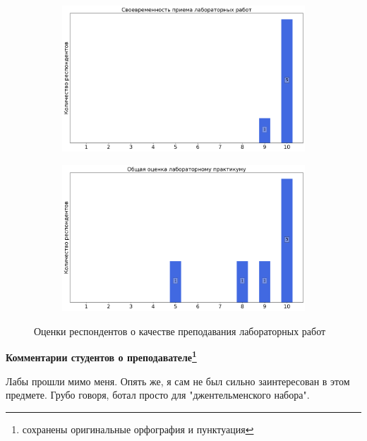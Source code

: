 \begin{figure}[H]
\begin{subfigure}[b]{0.45\textwidth}
                    \centering
                    \includegraphics[width=\textwidth]{images/3 course/Общая физика - квантовая физика/labniks-marks-Почернин И.Г.-2.png}
                \end{subfigure}
                \begin{subfigure}[b]{0.45\textwidth}
                    \centering
                    \includegraphics[width=\textwidth]{images/3 course/Общая физика - квантовая физика/labniks-marks-Почернин И.Г.-3.png}
                \end{subfigure}	
                \caption{Оценки респондентов о качестве преподавания лабораторных работ}
            \end{figure}

            \textbf{Комментарии студентов о преподавателе\protect\footnote{сохранены оригинальные орфография и пунктуация}}
                \begin{commentbox} 
                    Лабы прошли мимо меня. Опять же, я сам не был сильно заинтересован в этом предмете. Грубо говоря, ботал просто для "джентельменского набора".
                \end{commentbox}


